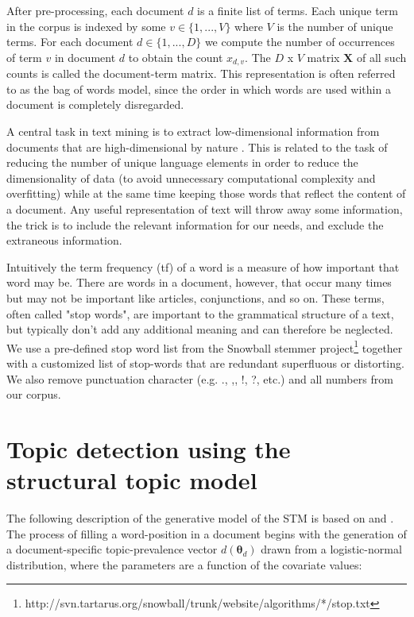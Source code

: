 \documentclass[12pt,a4paper,notitlepage]{article}
\begin{document}
After pre-processing, each document $d$ is a finite list of terms. Each unique term in the corpus is indexed by some $v \in \lbrace 1,...,V \rbrace$ where $V$ is the number of unique terms. For each document $d \in \lbrace 1,...,D \rbrace$ we compute the number of occurrences of term $v$ in document $d$ to obtain the count $x_{d,v}$. The $D$ x $V$ matrix $\boldsymbol{X}$ of all such counts is called the document-term matrix. This representation is often referred to as the bag of words model, since the order in which words are used within a document is completely disregarded. 

A central task in text mining is to extract low-dimensional information from documents that are high-dimensional by nature \citep{bholat_text_2015}. This is related to the task of reducing the number of unique language elements in order to reduce the dimensionality of data (to avoid unnecessary computational complexity and overfitting) while at the same time keeping those words that reflect the content of a document. Any useful representation of text will throw away some information, the trick is to include the relevant information for our needs, and exclude the extraneous information. 

Intuitively the term frequency (tf) of a word is a measure of how important that word may be. There are words in a document, however, that occur many times but may not be important like articles, conjunctions, and so on. These terms, often called "stop words", are important to the grammatical structure of a text, but typically don't add any additional meaning and can therefore be neglected. We use a pre-defined stop word list from the Snowball stemmer project\footnote{http://svn.tartarus.org/snowball/trunk/website/algorithms/*/stop.txt} together with a customized list of stop-words that are redundant superfluous or distorting. We also remove punctuation character (e.g. ., ,, !, ?, etc.) and all numbers from our corpus.  

\section{Topic detection using the structural topic model}\label{ch_model}

The following description of the generative model of the STM is based on \citet{roberts_structural_2013} and \citet{roberts_stm:_2016}. The process of filling a word-position in a document begins with the generation of a document-specific topic-prevalence vector $d(\boldsymbol{\theta}_d)$ drawn from a logistic-normal distribution, where the parameters are a function of the covariate values:
\end{document}
